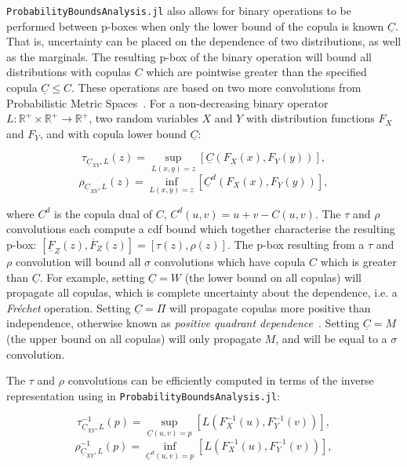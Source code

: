 \documentclass{juliacon}
\begin{document}
\texttt{ProbabilityBoundsAnalysis.jl} also allows for binary operations to be performed between p-boxes when only the lower bound of the copula is known $\underline{C}$. That is, uncertainty can be placed on the dependence of two distributions, as well as the marginals. The resulting p-box of the binary operation will bound all distributions with copulas $C$ which are pointwise greater than the specified copula $\underline{C} \leq C$. These operations are based on two more convolutions from Probabilistic Metric Spaces~\cite{schweizer2011probabilistic}. For a non-decreasing binary operator $L: \mathbb{R}^+\times \mathbb{R}^+ \to \mathbb{R}^+$, two random variables $X$ and $Y$ with distribution functions $F_X$ and $F_Y$, and with copula lower bound $\underline{C}$:

\begin{equation*}\label{taupbox}
  \tau_{\underline{C}_{XY},L}(z) = \sup_{L(x,y)=z} [\underline{C}(F_{X}(x), F_Y(y))],
\end{equation*}
\begin{equation*}\label{rhopbox}
  \rho_{\underline{C}_{XY},L}(z) = \inf_{L(x,y)=z} [\underline{C}^d(F_{X}(x), F_Y(y))],
\end{equation*}

where $C^d$ is the copula dual of $C$, $C^d(u,v) = u + v - C(u,v)$. The $\tau$ and $\rho$ convolutions each compute a cdf bound which together characterise the resulting p-box: $[\underline{F}_{Z}(z), \overline{F}_{Z}(z)] = [\tau(z), \rho(z)]$. The p-box resulting from a $\tau$ and $\rho$ convolution will bound all $\sigma$ convolutions which have copula $C$ which is greater than $\underline{C}$. For example, setting $\underline{C} = W$ (the lower bound on all copulas) will propagate all copulas, which is complete uncertainty about the dependence, i.e. a \textit{Fréchet} operation. Setting $\underline{C} = \Pi$ will propagate copulas more positive than independence, otherwise known as \textit{positive quadrant dependence}~\cite{nelsen2007introduction}. Setting $\underline{C} = M$ (the upper bound on all copulas) will only propagate $M$, and will be equal to a $\sigma$ convolution. 

The $\tau$ and $\rho$ convolutions can be efficiently computed in terms of the inverse representation using in \texttt{ProbabilityBoundsAnalysis.jl}: 

\begin{equation*}\label{taupbox2}
  \tau^{-1}_{\underline{C}_{XY},L}(p) = \sup_{\underline{C}(u,v) = p} [L(F^{-1}_{X}(u), F^{-1}_Y(v))],
\end{equation*}
\begin{equation*}\label{rhopbox2}
  \rho^{-1}_{\underline{C}_{XY},L}(p) = \inf_{\underline{C}^{d}(u,v) = p} [L(F^{-1}_{X}(u), F^{-1}_Y(v))],
\end{equation*}
\end{document}
